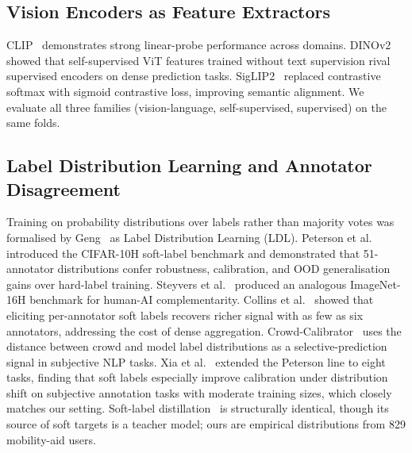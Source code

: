 \documentclass[conference]{IEEEtran}
\begin{document}
\subsection{Vision Encoders as Feature Extractors}
CLIP~\cite{radford2021learningtransferablevisualmodels} demonstrates strong linear-probe performance across domains. DINOv2~\cite{oquab2023dinov2} showed that self-supervised ViT features trained without text supervision rival supervised encoders on dense prediction tasks. SigLIP2~\cite{tschannen2025siglip2} replaced contrastive softmax with sigmoid contrastive loss, improving semantic alignment. We evaluate all three families (vision-language, self-supervised, supervised) on the same folds.

\subsection{Label Distribution Learning and Annotator Disagreement}
Training on probability distributions over labels rather than majority votes was formalised by Geng~\cite{geng2016label} as Label Distribution Learning (LDL). Peterson et al.~\cite{peterson2019humanuncertainty} introduced the CIFAR-10H soft-label benchmark and demonstrated that 51-annotator distributions confer robustness, calibration, and OOD generalisation gains over hard-label training. Steyvers et al.~\cite{steyvers2022bayesian} produced an analogous ImageNet-16H benchmark for human-AI complementarity. Collins et al.~\cite{collins2022elicit} showed that eliciting per-annotator soft labels recovers richer signal with as few as six annotators, addressing the cost of dense aggregation. Crowd-Calibrator~\cite{jiang2024crowdcalibrator} uses the distance between crowd and model label distributions as a selective-prediction signal in subjective NLP tasks. Xia et al.~\cite{xia2025softlabels} extended the Peterson line to eight tasks, finding that soft labels especially improve calibration under distribution shift on subjective annotation tasks with moderate training sizes, which closely matches our setting. Soft-label distillation~\cite{hinton2015distilling} is structurally identical, though its source of soft targets is a teacher model; ours are empirical distributions from 829 mobility-aid users.
\end{document}
